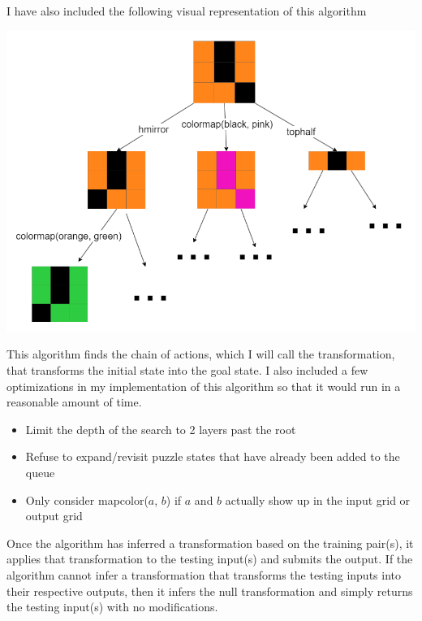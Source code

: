 \documentclass[letterpaper]{article} %
\begin{document}
\bigskip

I have also included the following visual representation of this algorithm
\begin{center}
    \includegraphics[width=\hsize]{BFS_tree.drawio.png}
\end{center}

\bigskip

This algorithm finds the chain of actions, which I will call the transformation, that transforms the initial state into the goal state. I also included a few optimizations in my implementation of this algorithm so that it would run in a reasonable amount of time.
\begin{itemize}
    \item Limit the depth of the search to 2 layers past the root
    \item Refuse to expand/revisit puzzle states that have already been added to the queue
    \item Only consider mapcolor($a$, $b$) if $a$ and $b$ actually show up in the input grid or output grid
\end{itemize}

\bigskip

Once the algorithm has inferred a transformation based on the training pair(s), it applies that transformation to the testing input(s) and submits the output. If the algorithm cannot infer a transformation that transforms the testing inputs into their respective outputs, then it infers the null transformation and simply returns the testing input(s) with no modifications.

\bigskip
\end{document}
